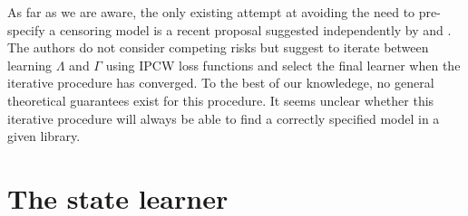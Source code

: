 \documentclass{statsoc}
\numberwithin{theorem}{section}
\newcommand{\1}{\mathds{1}}
\begin{document}
As far as we are aware, the only existing attempt at avoiding the need to
pre-specify a censoring model is a recent proposal suggested independently by
\cite{han2021inverse} and \cite{westling2021inference}. The authors do not
consider competing risks but suggest to iterate between learning \( \Lambda \)
and $\Gamma$ using IPCW loss functions and select the final learner when the
iterative procedure has converged. To the best of our knowledege, no general
theoretical guarantees exist for this procedure. It seems unclear whether this
iterative procedure will always be able to find a correctly specified model in a
given library.


\section{The state learner}
\label{sec:super-learner-simple}
\end{document}
